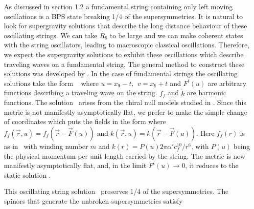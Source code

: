 As discussed in section 1.2  a  fundamental string 
containing only left moving oscillations is a BPS state
breaking 1/4  of the supersymmetries. It is natural
to look for supergravity solutions that describe the long distance
behaviour of these oscillating strings.  We
can take $R_9$ to be large and we  can make 
coherent states with the string oscillators, leading
to macroscopic classical oscillations. Therefore,  we expect 
the supergravity solutions to exhibit these oscillations which
describe traveling waves on a fundamental string.
The general method to construct these solutions was
developed by  \vespachati . In the case of fundamental
strings the oscillating solutions take the form \cmp\
\eqn{}
where $u=x_9-t,~~v=x_9 +t $ and 
 $F^i(u)$ are arbitrary functions describing a traveling wave on
the string. 
 $f_f$ and $\tilde k$ are harmonic functions. The solution
\single\ arises from the  chiral null models studied
in \hortsesing . 
  Since this metric is not manifestly asymptotically
flat, we prefer to make the simple change of coordinates
\eqn{}
which puts the fields in the form
\eqn{}
where $f_f(\vec r,u)=f_f(\vec r-\vec F(u))$ and $k(\vec r,u)= k(\vec
r-\vec F(u))$. Here  $f_f(r)$ is  as in
\formofa \cf\ with winding number $m$   and
$k(r)= P(u) {2 \pi \alpha' c_f^{10} /  r^6}
$, with $P(u)$ being the physical momentum per unit length 
 carried by
the string.
The metric is now manifestly asymptotically flat, and,
in the limit $F^i(u)\to 0$, it reduces to the static solution \fundstr .

This oscillating string solution \single\ preserves 1/4 of the 
supersymmetries. The spinors that generate the unbroken
supersymmetries satisfy
\eqn{}

